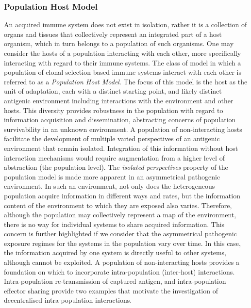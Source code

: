 \subsubsection{Population Host Model}
An acquired immune system does not exist in isolation, rather it is a collection of organs and tissues that collectively represent an integrated part of a host organism, which in turn belongs to a population of such organisms. One may consider the hosts of a population interacting with each other, more specifically interacting with regard to their immune systems. The class of model in which a population of clonal selection-based immune systems interact with each other is referred to as a \emph{Population Host Model}. The focus of this model is the host as the unit of adaptation, each with a distinct starting point, and likely distinct antigenic environment including interactions with the environment and other hosts. This diversity provides robustness in the population with regard to information acquisition and dissemination, abstracting concerns of population survivability in an unknown environment. 
A population of non-interacting hosts facilitate the development of multiple varied perspectives of an antigenic environment that remain isolated. Integration of this information without host interaction mechanisms would require augmentation from a higher level of abstraction (the population level). The \emph{isolated perspectives} property of the population model is made more apparent in an asymmetrical pathogenic environment. In such an environment, not only does the heterogeneous population acquire information in different ways and rates, but the information content of the environment to which they are exposed also varies. Therefore, although the population may collectively represent a map of the environment, there is no way for individual systems to share acquired information. This concern is further highlighted if we consider that the asymmetrical pathogenic exposure regimes for the systems in the population vary over time. In this case, the information acquired by one system is directly useful to other systems, although cannot be exploited. 
A population of non-interacting hosts provides a foundation on which to incorporate intra-population (inter-host) interactions. Intra-population re-transmission of captured antigen, and intra-population effector sharing provide two examples that motivate the investigation of decentralised intra-population interactions.

